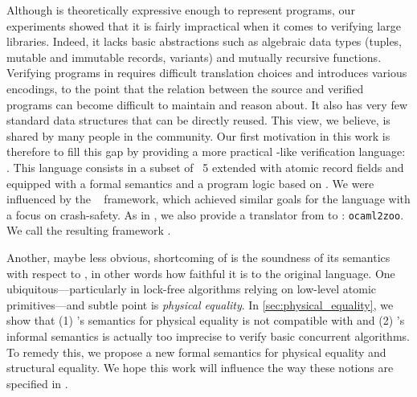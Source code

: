 Although \HeapLang is theoretically expressive enough to represent \OCaml programs, our experiments showed that it is fairly impractical when it comes to verifying large \OCaml libraries.
Indeed, it lacks basic abstractions such as algebraic data types (tuples, mutable and immutable records, variants) and mutually recursive functions.
Verifying \OCaml programs in \HeapLang requires difficult translation choices and introduces various encodings, to the point that the relation between the source and verified programs can become difficult to maintain and reason about.
It also has very few standard data structures that can be directly reused.
This view, we believe, is shared by many people in the \Iris community.
Our first motivation in this work is therefore to fill this gap by providing a more practical \OCaml-like verification language: \ZooLang.
This language consists in a subset of \OCaml~5 extended with atomic record fields and equipped with a formal semantics and a program logic based on \Iris.
We were influenced by the \Perennial~\cite{DBLP:conf/sosp/ChajedTKZ19,DBLP:conf/osdi/ChajedTT0KZ21,DBLP:conf/osdi/ChajedTTKZ22,DBLP:conf/osdi/Chang0STKZ23} framework, which achieved similar goals for the \Go language with a focus on crash-safety.
As in \Perennial, we also provide a translator from \OCaml to \ZooLang: \texttt{ocaml2zoo}.
We call the resulting framework \Zoo.

Another, maybe less obvious, shortcoming of \HeapLang is the soundness of its semantics with respect to \OCaml, in other words how faithful it is to the original language.
One ubiquitous---particularly in lock-free algorithms relying on low-level atomic primitives---and subtle point is \emph{physical equality}.
In \cref{sec:physical_equality}, we show that (1) \HeapLang's semantics for physical equality is not compatible with \OCaml and (2) \OCaml's informal semantics is actually too imprecise to verify basic concurrent algorithms.
To remedy this, we propose a new formal semantics for physical equality and structural equality.
We hope this work will influence the way these notions are specified in \OCaml.

